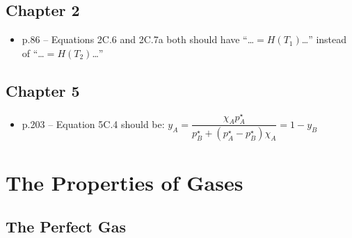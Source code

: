 \documentclass[12pt, openany, letterpaper]{memoir}
\begin{document}
\section*{Chapter 2}
\begin{itemize}
	\item p.86 -- Equations 2C.6 and 2C.7a both should have ``\ldots$=H(T_1)$\ldots''  instead of ``\ldots$=H(T_2)$\ldots''
\end{itemize}
\section*{Chapter 5}
\begin{itemize}
	\item p.203 -- Equation 5C.4 should be: $y_A = \dfrac{\chi_Ap^\star_A}{p^\star_B+\left(p^\star_A-p^\star_B\right)\chi_A} = 1-y_B$
\end{itemize}

\chapter{The Properties of Gases}
\section{The Perfect Gas}
\end{document}
